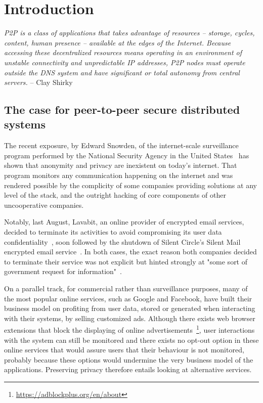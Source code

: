 \chapter{Introduction}

\textit{P2P is a class of applications that takes advantage of resources -- storage, cycles, content, human presence -- available at the edges of the Internet. Because accessing these decentralized resources means operating in an environment of unstable connectivity and unpredictable IP addresses, P2P nodes must operate outside the DNS system and have significant or total autonomy from central servers.} -- Clay Shirky~\cite{Shirky:2000}


\section{The case for peer-to-peer secure distributed systems}

The recent exposure, by Edward Snowden, of the internet-scale surveillance program performed by the National Security Agency in the United States~\cite{Schneier:2013} has shown that anonymity and privacy are inexistent on today's internet. That program monitors any communication happening on the internet and was rendered possible by the complicity of some companies providing solutions at any level of the stack, and the outright hacking of core components of other uncooperative companies.

Notably, last August, Lavabit, an online provider of encrypted email services, decided to terminate its activities to avoid compromising its user data confidentiality~\cite{Lavabit:2013}, soon followed by the shutdown of Silent Circle's Silent Mail encrypted email service~\cite{SilentCircle:2013}. In both cases, the exact reason both companies decided to terminate their service was not explicit but hinted strongly at "some sort of government request for information"~\cite{Tsukayama:2013}. 

On a parallel track, for commercial rather than surveillance purposes, many of the most popular online services, such as Google and Facebook, have built their business model on profiting from user data, stored or generated when interacting with their systems, by selling customized ads. Although there exists web browser extensions that block the displaying of online advertisements~\footnote{\url{https://adblockplus.org/en/about}}, user interactions with the system can still be monitored and there exists no opt-out option in these online services that would assure users that their behaviour is not monitored, probably because these options would undermine the very business model of the applications. Preserving privacy therefore entails looking at alternative services.

